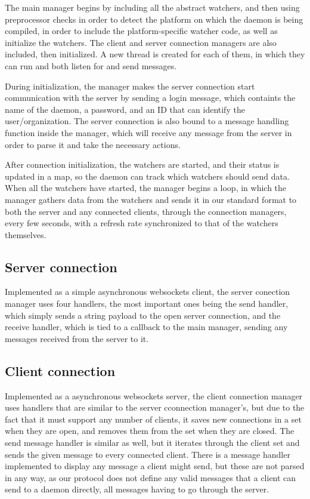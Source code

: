 \documentclass{l3proj}
\begin{document}
The main manager begins by including all the abstract watchers, and then using preprocessor checks in order to detect the platform on which the daemon is being compiled, in order to include the platform-specific watcher code, as well as initialize the watchers. The client and server connection managers are also included, then initialized. A new thread is created for each of them, in which they can run and both listen for and send messages. 

During initialization, the manager makes the server connection start communication with the server by sending a login message, which containts the name of the daemon, a password, and an ID that can identify the user/organization. The server connection is also bound to a message handling function inside the manager, which will receive any message from the server in order to parse it and take the necessary actions.

After connection initialization, the watchers are started, and their status is updated in a map, so the daemon can track which watchers should send data. When all the watchers have started, the manager begins a loop, in which the manager gathers data from the watchers and sends it in our standard format to both the server and any connected clients, through the connection managers, every few seconds, with a refresh rate synchronized to that of the watchers themselves.

\subsection{Server connection}

Implemented as a simple asynchronous websockets client, the server conection manager uses four handlers, the most important ones being the send handler, which simply sends a string payload to the open server connection, and the receive handler, which is tied to a callback to the main manager, sending any messages received from the server to it.

\subsection{Client connection}

Implemented as a asynchronous websockets server, the client connection manager uses handlers that are similar to the server cconnection manager's, but due to the fact that it must support any number of clients, it saves new connections in a set when they are open, and removes them from the set when they are closed. The send message handler is similar as well, but it iterates through the client set and sends the given message to every connected client. There is a message handler implemented to display any message a client might send, but these are not parsed in any way, as our protocol does not define any valid messages that a client can send to a daemon directly, all messages having to go through the server.
\end{document}
